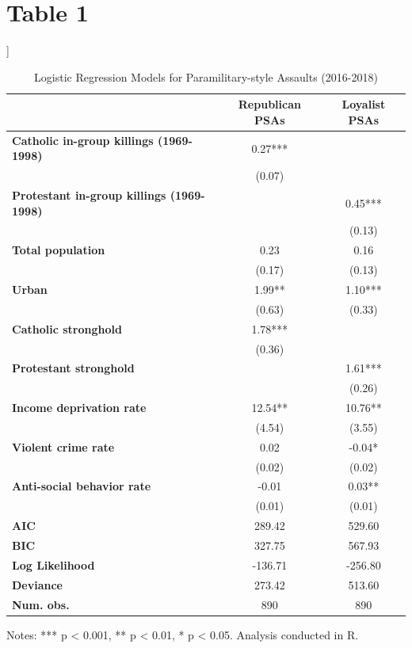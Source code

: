 \documentclass[12pt,letterpaper]{article}
\begin{document}
\newpage
\section*{Table 1}
		]
	
	\begin{table}[htbp]
		\centering
		\caption{Logistic Regression Models for Paramilitary-style Assaults (2016-2018)}
		\begin{tabular}{lcc}
			\toprule
			& \textbf{Republican PSAs} & \textbf{Loyalist PSAs} \\
			\midrule
			\textbf{Catholic in-group killings (1969-1998)} & 0.27*** & \\
			& (0.07) & \\
			\textbf{Protestant in-group killings (1969-1998)} & & 0.45*** \\
			& & (0.13) \\
			\textbf{Total population} & 0.23 & 0.16 \\
			& (0.17) & (0.13) \\
			\textbf{Urban} & 1.99** & 1.10*** \\
			& (0.63) & (0.33) \\
			\textbf{Catholic stronghold} & 1.78*** & \\
			& (0.36) & \\
			\textbf{Protestant stronghold} & & 1.61*** \\
			& & (0.26) \\
			\textbf{Income deprivation rate} & 12.54** & 10.76** \\
			& (4.54) & (3.55) \\
			\textbf{Violent crime rate} & 0.02 & -0.04* \\
			& (0.02) & (0.02) \\
			\textbf{Anti-social behavior rate} & -0.01 & 0.03** \\
			& (0.01) & (0.01) \\
			\midrule
			\textbf{AIC} & 289.42 & 529.60 \\
			\textbf{BIC} & 327.75 & 567.93 \\
			\textbf{Log Likelihood} & -136.71 & -256.80 \\
			\textbf{Deviance} & 273.42 & 513.60 \\
			\textbf{Num. obs.} & 890 & 890 \\
			\bottomrule
		\end{tabular}
		\label{tab:logistic_regression}
		\medskip
		\small
		\raggedright
		Notes: *** p < 0.001, ** p < 0.01, * p < 0.05. Analysis conducted in R.
	\end{table}
	\newpage
\end{document}
